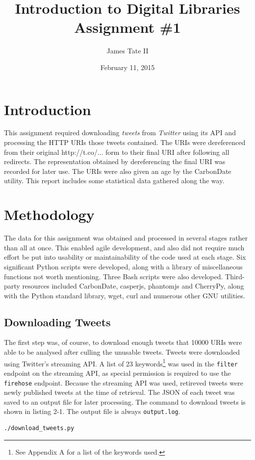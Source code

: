 \documentclass[a4paper,12pt]{article}
\begin{document}
\renewcommand{\thelstlisting}{\thesection-\arabic{lstlisting}}
\renewcommand{\thefigure}{\arabic{section}-\arabic{figure}}
\setlength{\floatsep}{0pt plus 2pt minus 2pt}

\title{Introduction to Digital Libraries Assignment \#1}
\date{February 11, 2015}
\author{James Tate II}
\maketitle

\section{Introduction}
This assignment required downloading \emph{tweets} from \emph{Twitter} using its API and processing the HTTP URIs
those tweets contained. The URIs were dereferenced from their original http://t.co/... form to their final
URI after following all redirects. The representation obtained by dereferencing the final URI was recorded
for later use. The URIs were also given an age by the CarbonDate utility. This report includes some statistical
data gathered along the way.

\section{Methodology}
The data for this assignment was obtained and processed in several stages rather than all at once. 
This enabled agile development, and also did not require much effort be put into usability or maintainability 
of the code used at each stage. Six significant Python scripts were developed, along with a library of
miscellaneous functions not worth mentioning. Three Bash scripts were also developed. Third-party resources
included CarbonDate, casperjs, phantomjs and CherryPy, along with the Python standard library, wget, curl and
numerous other GNU utilities.

\subsection{Downloading Tweets}
The first step was, of course, to download enough tweets that 10000 URIs were able to be analysed after culling
the unusable tweets. Tweets were downloaded using Twitter's streaming API. A list of 23 keywords\footnote{See
Appendix A for a list of the keywords used.} was used in
the \texttt{filter} endpoint on the streaming API, as special permission is required to use the \texttt{firehose}
endpoint. Because the streaming API was used, retireved tweets were newly published tweets at the time of
retrieval. The JSON of each tweet was saved to an output file for later processing. The command to download
tweets is shown in listing 2-1. The output file is always \texttt{output.log}.
\begin{lstlisting}[basicstyle=\ttfamily,caption={Downloading Tweets}]
    ./download_tweets.py
\end{lstlisting}
\end{document}
